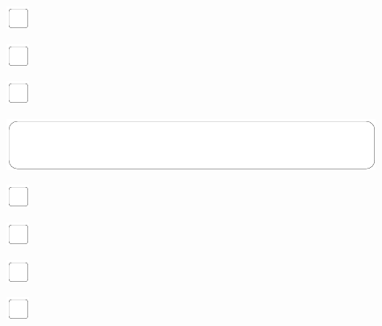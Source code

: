 \documentclass[11pt,titlepage]{article}
\begin{document}
\vspace{10mm}

\noindent
\includegraphics[]{checkbox-4mm.pdf}

\vspace{10mm}

\noindent
\includegraphics[]{checkbox-4mm.pdf}

\vspace{10mm}

\noindent
\includegraphics[]{checkbox-4mm.pdf}

\pagebreak

\small
\hfill

\vspace{6mm}

\noindent
\includegraphics[]{mediumbox.pdf}

\vspace{15mm}

\noindent
\includegraphics[]{checkbox-4mm.pdf}

\vspace{10mm}

\noindent
\includegraphics[]{checkbox-4mm.pdf}

\vspace{10mm}

\noindent
\includegraphics[]{checkbox-4mm.pdf}

\vspace{10mm}

\noindent
\includegraphics[]{checkbox-4mm.pdf}
\end{document}
